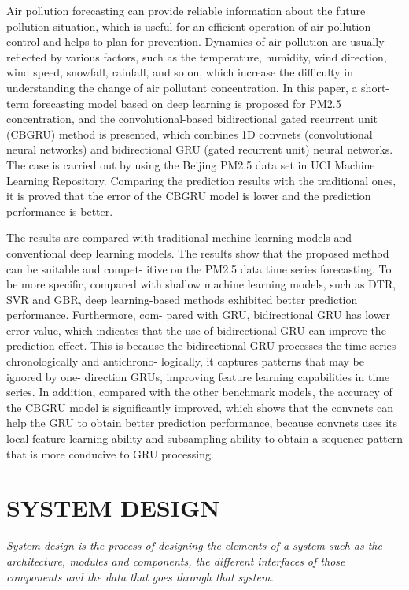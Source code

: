 Air pollution forecasting can provide reliable information about the future pollution situation,
which is useful for an efficient operation of air pollution control and helps to plan for prevention. Dynamics
of air pollution are usually reflected by various factors, such as the temperature, humidity, wind direction,
wind speed, snowfall, rainfall, and so on, which increase the difficulty in understanding the change of air
pollutant concentration. In this paper, a short-term forecasting model based on deep learning is proposed for
PM2.5 concentration, and the
convolutional-based bidirectional gated recurrent unit (CBGRU) method is presented, which combines 1D
convnets (convolutional neural networks) and bidirectional GRU (gated recurrent unit) neural networks. The
case is carried out by using the Beijing PM2.5 data set in UCI Machine Learning Repository. Comparing the
prediction results with the traditional ones, it is proved that the error of the CBGRU model is lower and the
prediction performance is better.


The results are compared with traditional mechine learning
models and conventional deep learning models. The results
show that the proposed method can be suitable and compet-
itive on the PM2.5 data time series forecasting. To be more
specific, compared with shallow machine learning models,
such as DTR, SVR and GBR, deep learning-based methods
exhibited better prediction performance. Furthermore, com-
pared with GRU, bidirectional GRU has lower error value,
which indicates that the use of bidirectional GRU can improve
the prediction effect. This is because the bidirectional GRU
processes the time series chronologically and antichrono-
logically, it captures patterns that may be ignored by one-
direction GRUs, improving feature learning capabilities in
time series. In addition, compared with the other benchmark
models, the accuracy of the CBGRU model is significantly
improved, which shows that the convnets can help the GRU to
obtain better prediction performance, because convnets uses
its local feature learning ability and subsampling ability to
obtain a sequence pattern that is more conducive to GRU
processing.



\chapter{SYSTEM DESIGN}  %

{\em System design is the process of designing the elements of a system such as the architecture,
modules and components, the different interfaces of those components and the data
that goes through that system. }

